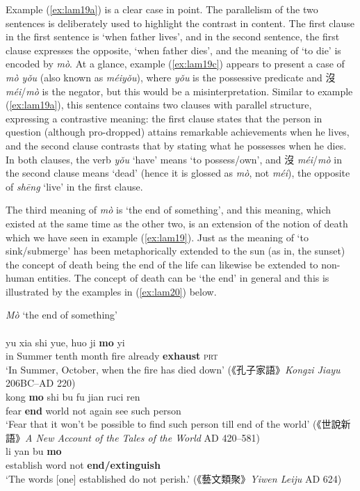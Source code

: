 \documentclass[output=paper]{langscibook}
\begin{document}
Example (\ref{ex:lam19a}) is a clear case in point. The parallelism of the two sentences is deliberately used to highlight the contrast in content. The first clause in the first sentence is `when father lives', and in the second sentence, the first clause expresses the opposite, `when father dies', and the meaning of `to die' is encoded by \textit{mò}. At a glance, example (\ref{ex:lam19c}) appears to present a case of \textit{mò yǒu} (also known as \textit{méiyǒu}), where \textit{yǒu} is the possessive predicate and 沒 \textit{méi}/\textit{mò} is the negator, but this would be a misinterpretation. Similar to example (\ref{ex:lam19a}), this sentence contains two clauses with parallel structure, expressing a contrastive meaning: the first clause states that the person in question (although pro-dropped) attains remarkable achievements when he lives, and the second clause contrasts that by stating what he possesses when he dies. In both clauses, the verb \textit{yǒu} `have' means `to possess/own', and 沒 \textit{méi}/\textit{mò} in the second clause means `dead' (hence it is glossed as \textit{mò}, not \textit{méi}), the opposite of \textit{shēng} `live' in the first clause. 

The third meaning of \textit{mò} is `the end of something', and this meaning, which existed at the same time as the other two, is an extension of the notion of death which we have seen in example (\ref{ex:lam19}). Just as the meaning of `to sink/submerge' has been metaphorically extended to the sun (as in, the sunset) the concept of death being the end of the life can likewise be extended to non-human entities. The concept of death can be `the end' in general and this is illustrated by the examples in (\ref{ex:lam20}) below. 

\ea \textit{Mò} `the end of something'  \label{ex:lam20}\\
   \label{ex:lam20a}\\
  	\gll yu xia shi yue, huo ji	\textbf{mo} yi\\
  	in	Summer	tenth	month fire already \textbf{exhaust} \textsc{prt}\\
  	\glt `In Summer, October, when the fire has died down' ({\cn 《孔子家語》}\emph{Kongzi Jiayu} 206BC–AD 220)
   \label{ex:lam20b}\\
  	\gll kong \textbf{mo} shi bu fu jian ruci ren\\
  	fear \textbf{end} world not again	see	such person\\
  	\glt `Fear that it won't be possible to find such person till end of the world' ({\cn 《世說新語》}\tablevspace\emph{A New Account of the Tales of the World} AD 420–581)
   \label{ex:lam20c}\\
	\gll li yan bu \textbf{mo}\\
	establish word not \textbf{end/extinguish}\\
	\glt `The words [one] established do not perish.' ({\cn 《藝文類聚》}\emph{Yiwen Leiju} AD 624)
\z \z
\end{document}
